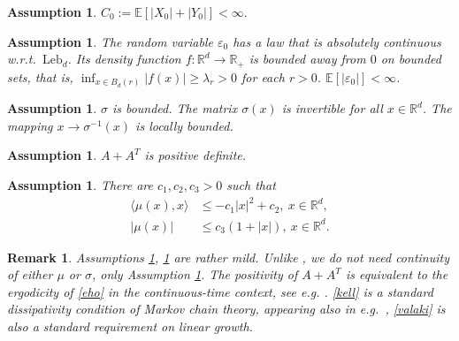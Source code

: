 \documentclass{article}
\newtheorem{remark}[theorem]{Remark}
\newtheorem{assumption}[theorem]{Assumption}
\begin{document}
\begin{assumption}\label{initiale}
$
C_{0}:=\mathbb{E}[|X_0|+|Y_0|]<\infty.
$
\end{assumption}

\begin{assumption}\label{bb}
The random variable $\varepsilon_{0}$ has a law that is absolutely continuous w.r.t.\ $\mathrm{Leb}_d$. Its density function 
$f:\mathbb{R}^{d}\to\mathbb{R}_{+}$ is %
bounded away from $0$ on bounded sets, that is, $\inf_{x\in B_d(r)}|f(x)|\geq \lambda_r>0$ for
each $r>0$.	
$\mathbb{E}[|\varepsilon_{0}|]<\infty$.
\end{assumption}

\begin{assumption}\label{mju}
$\sigma$ is bounded. The matrix $\sigma(x)$ is invertible
for all $x\in\mathbb{R}^d$. The mapping $x\to\sigma^{-1}(x)$ is locally bounded.
\end{assumption}

\begin{assumption}\label{aat}
$A+A^T$ is positive definite.
\end{assumption}

\begin{assumption}\label{equation}   
There are $c_{1},c_{2},c_3>0$ such that
\begin{align}
  \langle \mu(x),x\rangle&\leq -c_{1} |x|^{2}+c_{2},\ x\in\mathbb{R}^{d},\label{kell}\\
  |\mu(x)|&\leq c_3(1+|x|),\ x\in\mathbb{R}^d.\label{valaki}
\end{align}
\end{assumption}

\begin{remark} {\rm Assumptions \ref{initiale}, \ref{bb} are rather mild. Unlike \cite{varvenne}, we do not need continuity of
either $\mu$ or $\sigma$, only Assumption \ref{mju}. The positivity of $A+A^T$ is equivalent to the ergodicity of \eqref{eho} in the continuous-time context, 
see e.g. \cite{risken}. \eqref{kell} is a standard dissipativity condition of Markov chain theory,
appearing also in e.g.\ \cite{deya_et_al,varvenne}, \eqref{valaki} is also a standard requirement
on linear growth.}
\end{remark}
\end{document}

